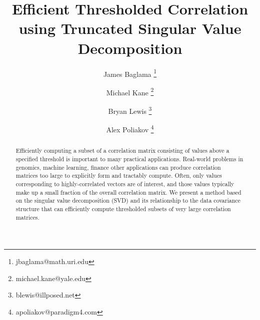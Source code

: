 \documentclass{article}
\title{Efficient Thresholded Correlation using Truncated Singular Value Decomposition}
\author[1]{James Baglama \thanks{jbaglama@math.uri.edu}}
\author[2]{Michael Kane \thanks{michael.kane@yale.edu}}
\author[3]{Bryan Lewis \thanks{blewis@illposed.net}}
\author[3]{Alex Poliakov \thanks{apoliakov@paradigm4.com}}
\affil[1]{
University of Rhode Island
}
\affil[2]{
Yale University
}
\affil[3]{
Paradigm4, Inc.
}
\let\proglang=\textsf
\numberwithin{algorithmctr}{section}
\begin{document}
\maketitle
\begin{abstract}
Efficiently computing a subset of a correlation matrix consisting of values
above a specified threshold is important to many practical applications.
Real-world problems in genomics, machine learning, finance other applications
can produce correlation matrices too large to explicitly form and tractably
compute. Often, only values corresponding to highly-correlated vectors are of
interest, and those values typically make up a small fraction of the overall
correlation matrix. We present a method based on the singular value
decomposition (SVD) and its relationship to the data covariance structure that
can efficiently compute thresholded subsets of very large correlation matrices.
\end{abstract}
\end{document}
